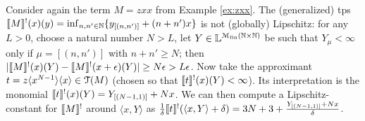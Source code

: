 \begin{example}
Consider again the term $M=zxx$ from Example \ref{ex:zxx}. 
%
 The (generalized) tps $\llbracket M\rrbracket^{!}(x)(y)= \inf_{n,n'\in \mathbb N}\{y_{[(n,n')]}+(n+n')x\}$ is not (globally) Lipschitz: for any 
$L>0$, choose a natural number $N>L$, let $Y\in \mathbb{L}^{\mathcal M_{\mathrm{fin}}(\mathbb N\times \mathbb N)}$ be such that $Y_{\mu}<\infty$ only if $\mu=[(n,n')]$ with $n+n'\geq N$; then $|\llbracket M\rrbracket^{!}(x)(Y)- \llbracket M\rrbracket^{!}(x+\epsilon)(Y)|\geq N\epsilon > L\epsilon$. 
Now take the approximant $t= z \langle x^{N-1}\rangle \langle x\rangle \in \mathcal{T}(M)$ (chosen so that $\llbracket t\rrbracket^{!}(x)(Y)<\infty$). Its interpretation is the monomial 
$\llbracket t\rrbracket^{!}(x)(Y) = Y_{[(N-1,1)]}+Nx$. We can then compute a Lipschitz-constant for $\llbracket M\rrbracket^{!}$ around $\langle x,Y\rangle$
as $\frac{1}{\delta}\llbracket t\rrbracket^{!}(\langle x,Y\rangle+\delta)= 3N+3 + \frac{Y_{[(N-1,1)]}+Nx}{\delta}$. 
\end{example}
%    
%
%

